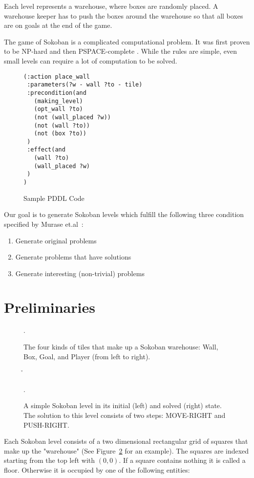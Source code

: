 \documentclass[runningheads]{llncs}
\begin{document}
Each level represents a warehouse, where boxes are randomly placed. A warehouse
keeper has to push the boxes around the warehouse so that all boxes are on goals
at the end of the game.

The game of Sokoban is a complicated computational problem. It was first proven
to be NP-hard \cite{dorit96} and then PSPACE-complete \cite{culberson97}. While
the rules are simple, even small levels can require a lot of computation to be
solved.


\begin{figure}
\centering
\begin{verbatim}
(:action place_wall
 :parameters(?w - wall ?to - tile)
 :precondition(and
   (making_level)
   (opt_wall ?to)
   (not (wall_placed ?w))
   (not (wall ?to))
   (not (box ?to))
 )
 :effect(and
   (wall ?to)
   (wall_placed ?w)
 )
)

\end{verbatim}
\caption{Sample PDDL Code}
\end{figure}

Our goal is to generate Sokoban levels which fulfill the following three condition
specified by Murase et.al~\cite{murase1996automatic}:
\begin{enumerate}
\item Generate original problems
\item Generate problems that have solutions
\item Generate interesting (non-trivial) problems
\end{enumerate}

\section{Preliminaries}

\begin{figure}
\centering
\w\e\x\e\g\e\p\n
\caption{The four kinds of tiles that make up a Sokoban warehouse: Wall, Box, Goal, and Player (from left to right).}.
\label{fig-tiles}
\end{figure}


\begin{figure}
\centering
\w\w\w\w\w\w\e\w\w\w\w\w\w\n
\w\p\e\x\g\w\e\w\e\e\p\h\w\n
\w\w\w\w\w\w\e\w\w\w\w\w\w\n
\caption{A simple Sokoban level in its initial (left) and solved (right) state. 
The solution to this level consists of two steps: MOVE-RIGHT and PUSH-RIGHT.}.
\label{fig-basic-level}
\end{figure}


Each Sokoban level consists of a two dimensional rectangular grid of squares that make
up the "warehouse" (See Figure~\ref{fig-basic-level} for an example). The squares are indexed starting from the top left with
$(0,0)$.
If a square contains nothing it is called a floor. Otherwise it is occupied by
one of the following entities:
\end{document}
